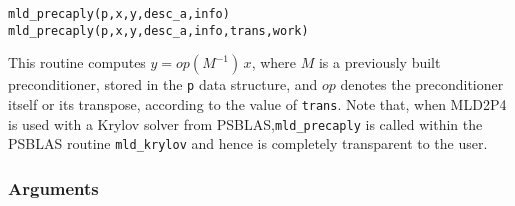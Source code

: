 \begin{center}
\verb|mld_precaply(p,x,y,desc_a,info)|\\
\verb|mld_precaply(p,x,y,desc_a,info,trans,work)|\\
\end{center}

\noindent
This routine computes $y = op(M^{-1})\, x$, where $M$ is a previously built
preconditioner, stored in the \verb|p| data structure, and $op$
denotes the preconditioner itself or its transpose, according to the value of \verb|trans|.
Note that, when MLD2P4 is used with a Krylov solver from PSBLAS,\verb|mld_precaply| is called
within the PSBLAS routine \verb|mld_krylov| and hence is completely transparent
to the user.

\subsubsection*{Arguments}

